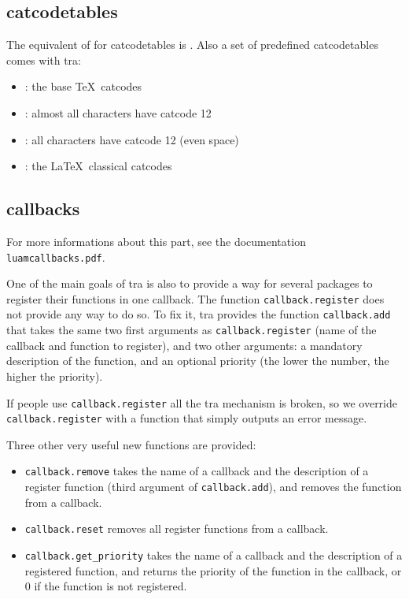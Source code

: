 \documentclass{article}
\begin{document}
\subsection{catcodetables}

The equivalent of \texttt{\string\newcount} for catcodetables is \texttt{\string\newluacatcodetable}. Also a set of predefined catcodetables comes with \LuaTeX tra:

\begin{itemize}
\item \texttt{\string\CatcodeTableIniTeX}: the base \TeX\ catcodes
\item \texttt{\string\CatcodeTableString}: almost all characters have catcode 12
\item \texttt{\string\CatcodeTableOther}: all characters have catcode 12 (even space)
\item \texttt{\string\CatcodeTableLaTeX}: the \LaTeX\ classical catcodes
\end{itemize}

\subsection{callbacks}

For more informations about this part, see the documentation \texttt{luamcallbacks.pdf}.

One of the main goals of \LuaTeX tra is also to provide a way for several packages to register their functions in one callback. The function \texttt{callback.register} does not provide any way to do so. To fix it, \LuaTeX tra provides the function \texttt{callback.add} that takes the same two first arguments as \texttt{callback.register} (name of the callback and function to register), and two other arguments: a mandatory description of the function, and an optional priority (the lower the number, the higher the priority).

If people use \texttt{callback.register} all the \LuaTeX tra mechanism is broken, so we override \texttt{callback.register} with a function that simply outputs an error message.

Three other very useful new functions are provided:

\begin{itemize}
\item \texttt{callback.remove} takes the name of a callback and the description of a register function (third argument of \texttt{callback.add}), and removes the function from a callback.
\item \texttt{callback.reset} removes all register functions from a callback.
\item \texttt{callback.get\_priority} takes the name of a callback and the description of a registered function, and returns the priority of the function in the callback, or 0 if the function is not registered.
\end{itemize}
\end{document}
